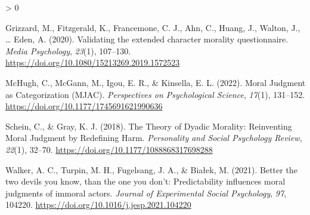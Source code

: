 \documentclass[
  american,
  man,floatsintext]{apa7}
\newlength{\cslhangindent}
\newenvironment{CSLReferences}[2] %
 {%
  \setlength{\parindent}{0pt}
  \ifodd #1 \everypar{\setlength{\hangindent}{\cslhangindent}}\ignorespaces\fi
  \ifnum #2 > 0
  \setlength{\parskip}{#2\baselineskip}
  \fi
 }%
 {}
\begin{document}
\hypertarget{refs}{}
\begin{CSLReferences}{1}{0}
\leavevmode\hypertarget{ref-grizzard_validating_2020}{}%
Grizzard, M., Fitzgerald, K., Francemone, C. J., Ahn, C., Huang, J., Walton, J., \ldots{} Eden, A. (2020). Validating the extended character morality questionnaire. \emph{Media Psychology}, \emph{23}(1), 107--130. \url{https://doi.org/10.1080/15213269.2019.1572523}

\leavevmode\hypertarget{ref-mchugh_moral_2022}{}%
McHugh, C., McGann, M., Igou, E. R., \& Kinsella, E. L. (2022). Moral {Judgment} as {Categorization} ({MJAC}). \emph{Perspectives on Psychological Science}, \emph{17}(1), 131--152. \url{https://doi.org/10.1177/1745691621990636}

\leavevmode\hypertarget{ref-schein_theory_2018}{}%
Schein, C., \& Gray, K. J. (2018). The {Theory} of {Dyadic Morality}: {Reinventing Moral Judgment} by {Redefining Harm}. \emph{Personality and Social Psychology Review}, \emph{22}(1), 32--70. \url{https://doi.org/10.1177/1088868317698288}

\leavevmode\hypertarget{ref-walker_better_2021}{}%
Walker, A. C., Turpin, M. H., Fugelsang, J. A., \& Białek, M. (2021). Better the two devils you know, than the one you don't: {Predictability} influences moral judgments of immoral actors. \emph{Journal of Experimental Social Psychology}, \emph{97}, 104220. \url{https://doi.org/10.1016/j.jesp.2021.104220}

\end{CSLReferences}
\end{document}
